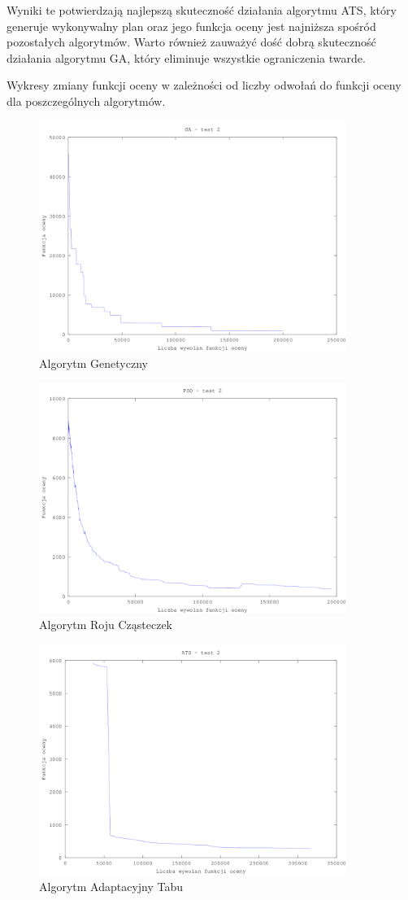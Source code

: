 Wyniki te potwierdzają najlepszą skuteczność działania algorytmu ATS, który generuje wykonywalny plan oraz jego funkcja oceny jest najniższa spośród pozostałych algorytmów. Warto również zauważyć dość dobrą skuteczność działania algorytmu GA, który eliminuje wszystkie ograniczenia twarde.
\par  Wykresy zmiany funkcji oceny w zależności od liczby odwołań do funkcji oceny dla poszczególnych algorytmów.
\begin{figure}[H]
  \caption{Algorytm Genetyczny}
  \centering
    \includegraphics[width=10cm]{ga_test_2.png}
\end{figure}
\begin{figure}[H]
  \caption{Algorytm Roju Cząsteczek}
  \centering
    \includegraphics[width=10cm]{pso_2.png}
\end{figure}
\begin{figure}[H]
  \caption{Algorytm Adaptacyjny Tabu}
  \centering
    \includegraphics[width=10cm]{ats_test_2.png}
\end{figure}
